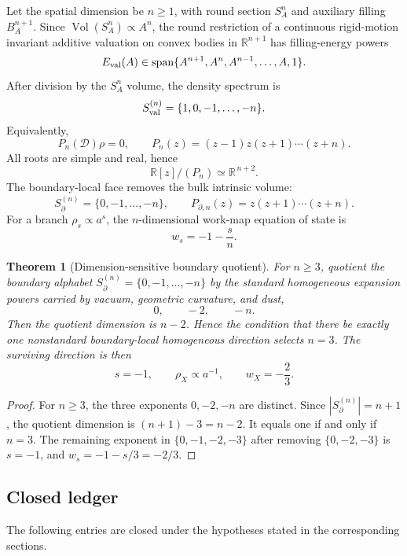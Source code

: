 \documentclass[aps,prd,reprint,nofootinbib,superscriptaddress,floatfix]{revtex4-2}
\numberwithin{equation}{section}
\theoremstyle{definition}
\theoremstyle{plain}
\newtheorem{theorem}{Theorem}[section]
\newcommand{\Dil}{\mathscr D}
\newcommand{\vol}{\operatorname{Vol}}
\newcommand{\spanop}{\operatorname{span}}
\begin{document}
Let the spatial dimension be \(n\ge1\), with round section \(S^n_A\) and
auxiliary filling \(B^{n+1}_A\).  Since \(\vol(S^n_A)\propto A^n\), the
round restriction of a continuous rigid-motion invariant additive valuation
on convex bodies in \(\mathbb R^{n+1}\) has filling-energy powers
\[
E_{\rm val}(A)\in
\spanop\{A^{n+1},A^n,A^{n-1},\ldots,A,1\}.
\]
After division by the \(S^n_A\) volume, the density spectrum is
\[
S_{\rm val}^{(n)}=\{1,0,-1,\ldots,-n\}.
\]
Equivalently,
\begin{equation}
\boxed{
P_n(\Dil)\rho=0,\qquad
P_n(z)=(z-1)z(z+1)\cdots(z+n).
}
\end{equation}
All roots are simple and real, hence
\[
\mathbb R[z]/(P_n)\simeq \mathbb R^{\,n+2}.
\]
The boundary-local face removes the bulk intrinsic volume:
\[
S_{\partial}^{(n)}=\{0,-1,\ldots,-n\},
\qquad
P_{\partial,n}(z)=z(z+1)\cdots(z+n).
\]
For a branch \(\rho_s\propto a^s\), the \(n\)-dimensional work-map equation
of state is
\[
w_s=-1-\frac{s}{n}.
\]

\begin{theorem}[Dimension-sensitive boundary quotient]
\label{thm:dimension-quotient}
For \(n\ge3\), quotient the boundary alphabet
\(S_{\partial}^{(n)}=\{0,-1,\ldots,-n\}\) by the standard homogeneous
expansion powers carried by vacuum, geometric curvature, and dust,
\[
0,\qquad -2,\qquad -n .
\]
Then the quotient dimension is \(n-2\).  Hence the condition that there be
exactly one nonstandard boundary-local homogeneous direction selects
\(n=3\).  The surviving direction is then
\[
\boxed{
s=-1,\qquad
\rho_X\propto a^{-1},\qquad
w_X=-\frac23 .
}
\]
\end{theorem}

\begin{proof}
For \(n\ge3\), the three exponents \(0,-2,-n\) are distinct.  Since
\(|S_{\partial}^{(n)}|=n+1\), the quotient dimension is
\((n+1)-3=n-2\).  It equals one if and only if \(n=3\).  The remaining
exponent in \(\{0,-1,-2,-3\}\) after removing \(\{0,-2,-3\}\) is \(s=-1\),
and \(w_s=-1-s/3=-2/3\).
\end{proof}

\subsection{Closed ledger}

The following entries are closed under the hypotheses stated in the
corresponding sections.
\end{document}
